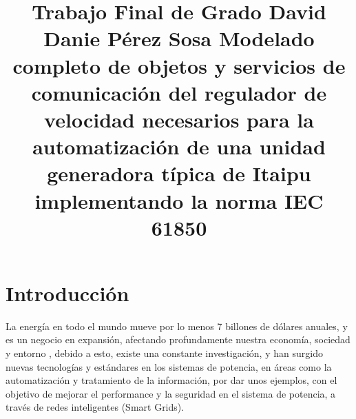\documentclass[conference,twocolumn]{IEEEtran}
\begin{document}
\title{Trabajo Final de Grado  David Danie P\'erez Sosa}

\title{
	Modelado completo de objetos y servicios de comunicaci\'on del regulador de velocidad necesarios para la automatizaci\'on de una unidad generadora t\'ipica de Itaipu implementando la norma IEC 61850
}

\author{
}



\maketitle




\IEEEpeerreviewmaketitle







\section{Introducci\'on}

La energ\'ia en todo el mundo mueve por lo menos 7 billones de d\'olares anuales, y es un negocio en expansi\'on, afectando profundamente nuestra econom\'ia, sociedad y entorno \cite{Dukert2009}, debido a esto, existe una constante investigaci\'on, y han surgido nuevas tecnolog\'ias y est\'andares en los sistemas de potencia, en \'areas como la automatizaci\'on y tratamiento de la informaci\'on, por dar unos ejemplos, con el objetivo de mejorar el performance y la seguridad en el sistema de potencia, a trav\'es de redes inteligentes (Smart Grids).\\
\end{document}
